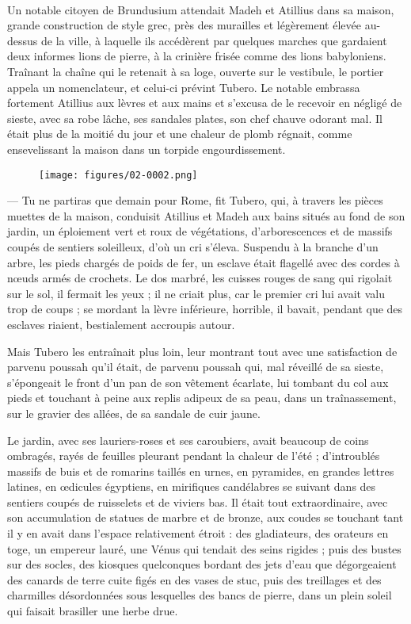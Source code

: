 \documentclass[a4paper, 11pt, oneside, polutonikogreek, french]{article}
\begin{document}
\paragraph{}
Un notable citoyen de Brundusium attendait Madeh et Atillius dans sa maison, grande construction de style grec, près des murailles et légèrement élevée au-dessus de la ville, à laquelle ils accédèrent par quelques marches que gardaient deux informes lions de pierre, à la crinière frisée comme des lions babyloniens. Traînant la chaîne qui le retenait à sa loge, ouverte sur le vestibule, le portier appela un nomenclateur, et celui-ci prévint Tubero. Le notable embrassa fortement Atillius aux lèvres et aux mains et s'excusa de le recevoir en négligé de sieste, avec sa robe lâche, ses sandales plates, son chef chauve odorant mal. Il était plus de la moitié du jour et une chaleur de plomb régnait, comme ensevelissant la maison dans un torpide engourdissement.
\begin{figure}[H]
\centering
\texttt{[image: figures/02-0002.png]}
\end{figure}
--- Tu ne partiras que demain pour Rome, fit Tubero, qui, à travers les pièces muettes de la maison, conduisit Atillius et Madeh aux bains situés au fond de son jardin, un éploiement vert et roux de végétations, d'arborescences et de massifs coupés de sentiers soleilleux, d'où un cri s'éleva. Suspendu à la branche d'un arbre, les pieds chargés de poids de fer, un esclave était flagellé avec des cordes à nœuds armés de crochets. Le dos marbré, les cuisses rouges de sang qui rigolait sur le sol, il fermait les yeux ; il ne criait plus, car le premier cri lui avait valu trop de coups ; se mordant la lèvre inférieure, horrible, il bavait, pendant que des esclaves riaient, bestialement accroupis autour.

Mais Tubero les entraînait plus loin, leur montrant tout avec une satisfaction de parvenu poussah qu'il était, de parvenu poussah qui, mal réveillé de sa sieste, s'épongeait le front d'un pan de son vêtement écarlate, lui tombant du col aux pieds et touchant à peine aux replis adipeux de sa peau, dans un traînassement, sur le gravier des allées, de sa sandale de cuir jaune.

Le jardin, avec ses lauriers-roses et ses caroubiers, avait beaucoup de coins ombragés, rayés de feuilles pleurant pendant la chaleur de l'été ; d'introublés massifs de buis et de romarins taillés en urnes, en pyramides, en grandes lettres latines, en œdicules égyptiens, en mirifiques candélabres se suivant dans des sentiers coupés de ruisselets et de viviers bas. Il était tout extraordinaire, avec son accumulation de statues de marbre et de bronze, aux coudes se touchant tant il y en avait dans l'espace relativement étroit : des gladiateurs, des orateurs en toge, un empereur lauré, une Vénus qui tendait des seins rigides ; puis des bustes sur des socles, des kiosques quelconques bordant des jets d'eau que dégorgeaient des canards de terre cuite figés en des vases de stuc, puis des treillages et des charmilles désordonnées sous lesquelles des bancs de pierre, dans un plein soleil qui faisait brasiller une herbe drue.
\end{document}
